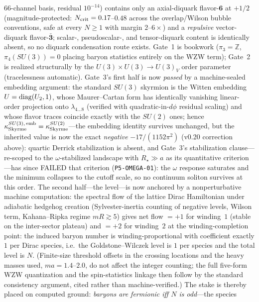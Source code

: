 \documentclass[11pt,a4paper]{article}
\begin{document}
$66$-channel basis, residual $10^{-14}$) contains only an
axial-diquark flavor-$\mathbf{6}$ at $+1/2$
(magnitude-protected: $N_{\rm crit} = 0.17$--$0.48$ across the
overlap/Wilson bubble conventions, safe at every $N \geq 1$ with
margin $2$--$6\times$) and a \emph{repulsive} vector-diquark
flavor-$\bar{\mathbf{3}}$; scalar-, pseudoscalar-, and
tensor-diquark content is identically absent, so no diquark
condensation route exists.
Gate~1 is bookwork ($\pi_3 = \mathbb{Z}$, $\pi_4(SU(3)) = 0$
placing baryon statistics entirely on the WZW term); Gate~2 is
realized structurally by the $U(3)\times U(3) \to U(3)_V$ order
parameter (tracelessness automatic).  Gate~3's first half is now \emph{passed} by a machine-sealed
embedding argument: the standard $SU(3)$ skyrmion is the Witten
embedding $U = {\rm diag}(U_2, 1)$, whose Maurer--Cartan form has
identically vanishing linear-order projection onto
$\lambda_{4\ldots 8}$ (verified with quadratic-in-$d\phi$
residual scaling) and whose flavor traces coincide exactly with
the $SU(2)$ ones; hence
$\kappa_{\rm Skyrme}^{SU(3),\,{\rm emb}} =
\kappa_{\rm Skyrme}^{SU(2)}$---the embedding identity survives
unchanged, but the inherited value is now the exact
\emph{negative} $-17/(1152\pi^2)$ (v0.20 correction above):
quartic Derrick stabilization is absent, and Gate~3's
stabilization clause---re-scoped to the $\omega$-stabilized
landscape with $R_\star \gg a$ as its quantitative
criterion---has since FAILED that criterion
(\texttt{P5-OMEGA-01}): the $\omega$ response saturates and the
minimum collapses to the cutoff scale, so no continuum soliton
survives at this order.  The second half---the level---is now anchored by a
nonperturbative machine computation: the spectral flow of the
lattice Dirac Hamiltonian under adiabatic hedgehog creation
(Sylvester-inertia counting of negative levels, Wilson term,
Kahana--Ripka regime $mR \gtrsim 5$) gives net flow $= +1$ for
winding~$1$ (stable on the inter-sector plateau) and $= +2$ for
winding~$2$ at the winding-completion point: the induced baryon
number is winding-proportional with coefficient exactly $1$ per
Dirac species, i.e.\ the Goldstone--Wilczek level is $1$ per
species and the total level is $N$.  (Finite-size threshold
offsets in the crossing locations and the heavy masses used,
$ma = 1.4$--$2.0$, do not affect the integer counting; the full
five-form WZW quantization and the spin-statistics linkage then
follow by the standard consistency argument, cited rather than
machine-verified.)  The stake is thereby placed on computed
ground: \emph{baryons are fermionic iff $N$ is odd}---the species
\end{document}
